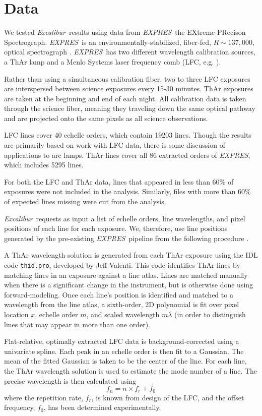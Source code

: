 \documentclass[modern]{aastex63}
\newcommand{\project}[1]{\textsl{#1}}
\newcommand{\name}{\project{Excalibur}}
\newcommand{\acronym}[1]{{\small{#1}}}
\newcommand{\expres}{\project{\acronym{EXPRES}}}
\begin{document}
\section{Data} \label{sec:data}
We tested \name\ results using data from \expres\, the EXtreme PRecison Spectrograph.  \expres\ is an environmentally-stabilized, fiber-fed, $R\sim137,000$, optical spectrograph \citep{jurgenson2016, blackman2020}.  \expres\ has two different wavelength calibration sources, a ThAr lamp and a Menlo Systems laser frequency comb (LFC, e.g. \cite{wilken2012, molaro2013, probst2014}).

Rather than using a simultaneous calibration fiber, two to three LFC exposures are interspersed between science exposures every 15-30 minutes.  ThAr exposures are taken at the beginning and end of each night.  All calibration data is taken through the science fiber, meaning they traveling down the same optical pathway and are projected onto the same pixels as all science observations.

LFC lines cover 40 echelle orders, which contain 19203 lines.  Though the results are primarily based on work with LFC data, there is some discussion of applications to arc lamps.   ThAr lines cover all 86 extracted orders of \expres, which includes 5295 lines.

For both the LFC and ThAr data, lines that appeared in less than 60\% of exposures were not included in the analysis.  Similarly, files with more than 60\% of expected lines missing were cut from the analysis.  

 \name\ requests as input a list of echelle orders, line wavelengths, and pixel positions of each line for each exposure.  We, therefore, use line positions generated by the pre-existing \expres\ pipeline from the following procedure \citep{petersburg2020}.
 
 A ThAr wavelength solution is generated from each ThAr exposure using the IDL code \texttt{thid.pro}, developed by Jeff Valenti.  This code identifies ThAr lines by matching lines in an exposure against a line atlas.  Lines are matched manually when there is a significant change in the instrument, but is otherwise done using forward-modeling.  Once each line's position is identified and matched to a wavelength from the line atlas, a sixth-order, 2D polynomial is fit over pixel location $x$, echelle order $m$, and scaled wavelength $m\lambda$ (in order to distinguish lines that may appear in more than one order).
 
 Flat-relative, optimally extracted LFC data is background-corrected using a univariate spline.  Each peak in an echelle order is then fit to a Gaussian.  The mean of the fitted Gaussian is taken to be the center of the line.  For each line, the ThAr wavelength solution is used to estimate the mode number of a line.  The precise wavelength is then calculated using
 \begin{equation}
 f_n = n \times  f_r + f_0
 \label{eq:lfc}
 \end{equation}
 where the repetition rate, $f_r$, is known from design of the LFC, and the offset frequency, $f_0$, has been determined experimentally.
 
\end{document}
